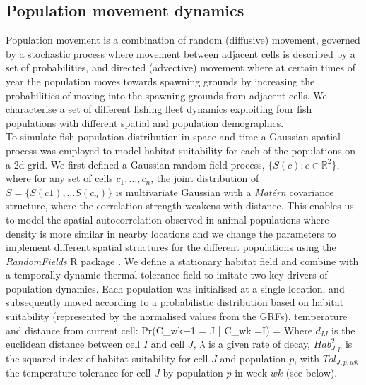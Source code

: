 \documentclass[review]{elsarticle}
\let\oldequation\equation
\let\oldendequation\endequation
\renewenvironment{equation}
 {\linenomathNonumbers\oldequation}
 {\oldendequation\endlinenomath}
\begin{document}
\subsection{Population movement dynamics}

Population movement is a combination of random (diffusive) movement, governed
by a stochastic process where movement between adjacent cells is described by a
set of probabilities, and directed (advective) movement where at certain times
of year the population moves towards spawning grounds by increasing the
probabilities of moving into the spawning grounds from adjacent cells. We
characterise a set of different fishing fleet dynamics exploiting four fish
populations with different spatial and population demographics. \\

To simulate fish population distribution in space and time a Gaussian spatial
process was employed to model habitat suitability for each of the populations
on a 2d grid.  We first defined a Gaussian random field process, $\{S(c) : c \in
\mathbb{R}^2\}$, where for any set of cells $c_{1}, \dots, c_{n}$, the joint
distribution of $S = \{S(c1),\dots S(c_{n})\}$ is multivariate Gaussian with a
\textit{Matérn} covariance structure, where the correlation strength weakens
with distance. This enables us to model the spatial autocorrelation observed in
animal populations where density is more similar in nearby locations
\citep{Tobler1970, F.Dormann2007} and we change the parameters to implement
different spatial structures for the different populations using the
\textit{RandomFields} R package \citep{Schlater2015}. We define a stationary
habitat field and combine with a temporally dynamic thermal tolerance field to
imitate two key drivers of population dynamics. Each population was initialised
at a single location, and subsequently moved according to a probabilistic
distribution based on habitat suitability (represented by the normalised values
from the GRFs), temperature and distance from current cell: 
\begin{equation}
	Pr(C_{wk+1} = J | C_{wk} =I) = 
\end{equation}
Where $d_{IJ}$ is the euclidean distance between cell $I$ and cell $J$,
$\lambda$ is a given rate of decay, $Hab_{J,p}^2$ is the squared index of
habitat suitability for cell $J$ and population $p$, with $Tol_{J,p,wk}$ the
temperature tolerance for cell $J$ by population $p$ in week $wk$ (see
below). \\
\end{document}
